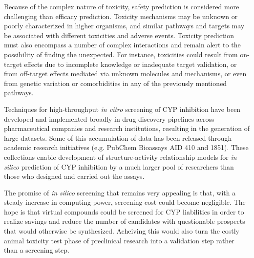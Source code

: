 
Because of the complex nature of toxicity, safety prediction is considered more challenging than efficacy prediction. Toxicity mechanisms may be unknown or poorly characterized in higher organisms, and similar pathways and targets may be associated with different toxicities and adverse events. Toxicity prediction must also encompass a number of complex interactions and remain alert to the possibility of finding the unexpected. For instance, toxicities could result from on-target effects due to incomplete knowledge or inadequate target validation, or from off-target effects mediated via unknown molecules and mechanisms, or even from genetic variation or comorbidities in any of the previously mentioned pathways. \cite{Kruhlak2012}

Techniques for high-throughput \textit{in vitro} screening of CYP inhibition have been developed and implemented broadly in drug discovery pipelines across pharmaceutical companies and research institutions, resulting in the generation of large datasets. Some of this accumulation of data has been released through academic research initiatives (e.g. PubChem Bioassays AID 410 and 1851). These collections enable development of structure-activity relationship models for \textit{in silico} prediction of CYP inhibition by a much larger pool of researchers than those who designed and carried out the assays.

The promise of \textit{in silico} screening that remains very appealing is that, with a steady increase in computing power, screening cost could become negligible. The hope is that virtual compounds could be screened for CYP liabilities in order to realize savings and reduce the number of candidates with questionable prospects that would otherwise be synthesized. \cite{Zlokarnik2005} Acheiving this would also turn the costly animal toxicity test phase of preclinical research into a validation step rather than a screening step.


